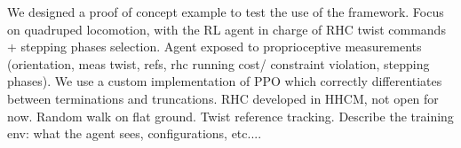{\Large We designed a proof of concept example to test the use of the framework. Focus on quadruped locomotion, with the RL agent in charge of RHC twist commands + stepping phases selection. Agent exposed to proprioceptive measurements (orientation, meas twist, refs, rhc running cost/ constraint violation, stepping phases). We use a custom implementation of PPO which correctly differentiates between terminations and truncations. RHC developed in HHCM, not open for now. Random walk on flat ground. Twist reference tracking. Describe the training env: what the agent sees, configurations, etc....}
\vspace{10cm}
